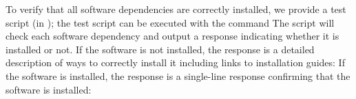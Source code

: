 To verify that all software dependencies are correctly installed, we
provide a test script (in ); the test script can 
be executed with the command
The script will check each software dependency and output a response indicating 
whether it is installed or not. 
If the software is not installed, the response is a detailed description of ways to correctly install it including links to installation guides: 
If the software is installed, the response is a single-line response confirming that the software is installed:


